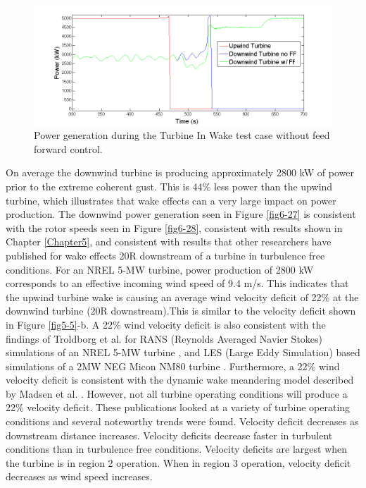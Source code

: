 \begin{figure}[ht] 
	\centering
		\includegraphics[width = \linewidth]{Figures/ch6Figures/fig6-29.png}

	\caption{Power generation during the Turbine In Wake test case without feed forward control.}
	\label{fig6-29}
\end{figure}

On average the downwind turbine is producing approximately 2800 kW of power prior to the extreme coherent gust. This is 44\% less power than the upwind turbine, which illustrates that wake effects can a very large impact on power production. The downwind power generation seen in Figure \ref{fig6-27} is consistent with the rotor speeds seen in Figure \ref{fig6-28}, consistent with results shown in Chapter \ref{Chapter5}, and consistent with results that other researchers have published for wake effects 20R downstream of a turbine in turbulence free conditions. For an NREL 5-MW turbine, power production of 2800 kW corresponds to an effective incoming wind speed of 9.4 m/s. This indicates that the upwind turbine wake is causing an average wind velocity deficit of 22\%  at the downwind turbine (20R downstream).This is similar to the velocity deficit shown in Figure \ref{fig5-5}-b. A 22\% wind velocity deficit is also consistent with the findings of Troldborg et al. for RANS (Reynolds Averaged Navier Stokes) simulations of an NREL 5-MW turbine \cite{troldborg2015}, and LES (Large Eddy Simulation) based simulations of a 2MW NEG Micon NM80 turbine \cite{troldborg2010}. Furthermore, a 22\% wind velocity deficit is consistent with the dynamic wake meandering model described by Madsen et al. \cite{madsen2010}. However, not all turbine operating conditions will produce a 22\% velocity deficit. These publications looked at a variety of turbine operating conditions and several noteworthy trends were found. Velocity deficit decreases as downstream distance increases. Velocity deficits decrease faster in turbulent conditions than in turbulence free conditions. Velocity deficits are largest when the turbine is in region 2 operation. When in region 3 operation, velocity deficit decreases as wind speed increases.


